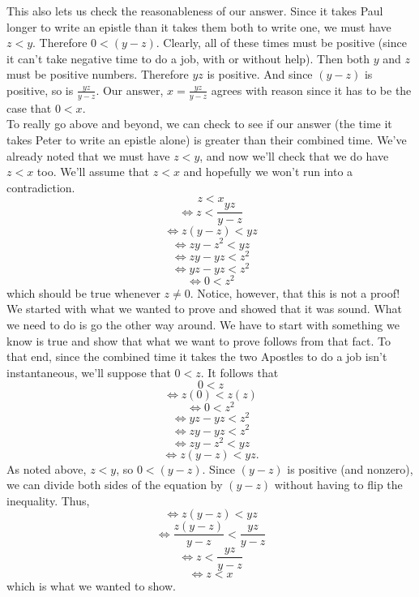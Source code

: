 \documentclass[11pt,letterpaper]{article}
\begin{document}
This also lets us check the reasonableness of our answer. Since it takes Paul longer to write an epistle than it takes them both to write one, we must have $z < y$. Therefore $0 < (y - z)$. Clearly, all of these times must be positive (since it can't take negative time to do a job, with or without help). Then both $y$ and $z$ must be positive numbers. Therefore $yz$ is positive. And since $(y - z)$ is positive, so is $\frac{yz}{y-z}$. Our answer, $x = \frac{yz}{y-z}$ agrees with reason since it has to be the case that $0 < x$. 
\\

To really go above and beyond, we can check to see if our answer (the time it takes Peter to write an epistle alone) is greater than their combined time. We've already noted that we must have $z < y$, and now we'll check that we do have $z < x$ too. We'll assume that $z < x$ and hopefully we won't run into a contradiction. 
$$ z < x $$
$$ \iff z < \frac{yz}{y-z}$$
$$ \iff z(y-z) < yz $$
$$ \iff zy - z^2 < yz $$
$$ \iff zy - yz < z^2 $$
$$ \iff yz - yz < z^2 $$
$$ \iff 0 < z^2 $$
which should be true whenever $z \neq 0$. Notice, however, that this is not a proof! We started with what we wanted to prove and showed that it was sound. What we need to do is go the other way around. We have to start with something we know is true and show that what we want to prove follows from that fact. To that end, since the combined time it takes the two Apostles to do a job isn't instantaneous, we'll suppose that $0 < z$. It follows that
$$ 0 < z $$
$$ \iff z (0) < z (z) $$ 
$$ \iff 0 < z^2 $$
$$ \iff yz - yz < z^2 $$
$$ \iff zy - yz < z^2 $$
$$ \iff zy - z^2 < yz $$
$$ \iff z(y-z) < yz. $$
As noted above, $z < y$, so $0 < (y-z)$. Since $(y-z)$ is positive (and nonzero), we can divide both sides of the equation by $(y-z)$ without having to flip the inequality. Thus,
$$ \iff z(y-z) < yz $$
$$ \iff \frac{z(y-z)}{y-z} < \frac{yz}{y-z}$$
$$ \iff z < \frac{yz}{y-z}$$
$$ \iff z < x $$
which is what we wanted to show. 
\end{document}
